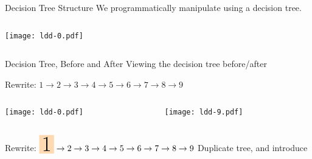 
\begin{frame}{Decision Tree Structure}
  We programmatically manipulate  using a decision tree.

  \begin{columns}
    \begin{column}{0.5\textwidth}
      \texttt{[image: ldd-0.pdf]}
    \end{column}
    \begin{column}{0.5\textwidth}  %
      \usebox\typecaseAbox
    \end{column}    
  \end{columns}
\end{frame}

\begin{frame}{Decision Tree, Before and After}
  Viewing the decision tree before/after

  \medskip
  
  Rewrite: $1 \to 2\to 3\to 4\to 5\to 6\to 7\to 8\to 9$

  \medskip
  
  \begin{columns}
    \begin{column}{0.5\textwidth}
      \texttt{[image: ldd-0.pdf]}
    \end{column}
    \begin{column}{0.5\textwidth}  %
      \texttt{[image: ldd-9.pdf]}
    \end{column}
  \end{columns}
\end{frame}


\def\myLeftArrow{\smash{
  \begin{tikzpicture}[baseline=-2mm]
    \useasboundingbox (-2,0);
    \node[single arrow,draw=black,fill=red!10,minimum width=5cm,minimum height=7cm,shape border rotate=180] at (0,-1) {};
  \end{tikzpicture}
}}


\begin{frame}{Rewrite: $\colorbox{orange!30}{\Huge 1}\to 2\to 3\to 4\to 5\to 6\to 7\to 8\to 9$}%
  Duplicate tree, and introduce \colorbox{pink!30}{}

  \begin{columns}
    \begin{column}{0.5\textwidth}
    \end{column}
    \begin{column}{0.5\textwidth}  %
    \end{column}    
  \end{columns}
\end{frame}

